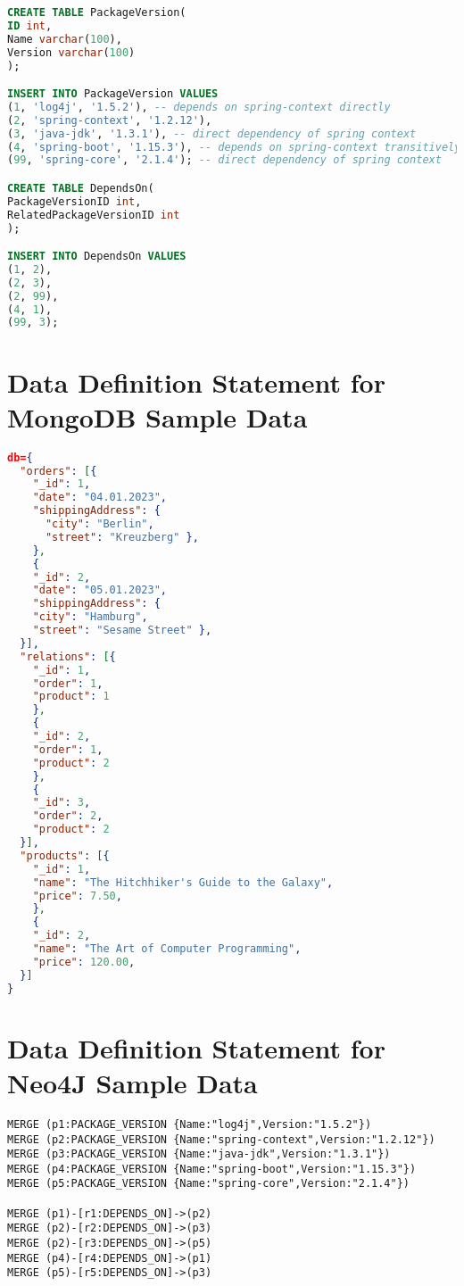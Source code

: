 \begin{lstlisting}[language=SQL, caption=DDL Statements, captionpos=b, label=lst:DDLStatements]
CREATE TABLE PackageVersion(
ID int,
Name varchar(100),
Version varchar(100)
);

INSERT INTO PackageVersion VALUES 
(1, 'log4j', '1.5.2'), -- depends on spring-context directly
(2, 'spring-context', '1.2.12'),
(3, 'java-jdk', '1.3.1'), -- direct dependency of spring context
(4, 'spring-boot', '1.15.3'), -- depends on spring-context transitively (spring-boot -> log4j -> spring-context)
(99, 'spring-core', '2.1.4'); -- direct dependency of spring context

CREATE TABLE DependsOn(
PackageVersionID int,
RelatedPackageVersionID int
);

INSERT INTO DependsOn VALUES 
(1, 2), 
(2, 3), 
(2, 99),
(4, 1),
(99, 3);
\end{lstlisting}

\section{Data Definition Statement for MongoDB Sample Data} \label{apx:Data Definition Statement for MongoDB Sample Data}
\begin{lstlisting}[language=JSON, caption=JSON, captionpos=b, label=lst:MongoDBStatements]
db={
  "orders": [{
    "_id": 1,
    "date": "04.01.2023",
    "shippingAddress": {
      "city": "Berlin",
      "street": "Kreuzberg" },
    },
    {
    "_id": 2,
    "date": "05.01.2023",
    "shippingAddress": {
    "city": "Hamburg",
    "street": "Sesame Street" },
  }],
  "relations": [{
    "_id": 1,
    "order": 1,
    "product": 1
    },
	{
    "_id": 2,
    "order": 1,
    "product": 2
    },
    {
    "_id": 3,
    "order": 2,
    "product": 2
  }],
  "products": [{
    "_id": 1,
    "name": "The Hitchhiker's Guide to the Galaxy",
    "price": 7.50,
    },
    {
    "_id": 2,
    "name": "The Art of Computer Programming",
    "price": 120.00,	
  }]
}
\end{lstlisting}

\section{Data Definition Statement for Neo4J Sample Data} \label{apx:Data Definition Statement for Neo4J Sample Data}
\begin{lstlisting}[caption=Cypher Statements, captionpos=b, label=lst:CypherStatements]
MERGE (p1:PACKAGE_VERSION {Name:"log4j",Version:"1.5.2"})
MERGE (p2:PACKAGE_VERSION {Name:"spring-context",Version:"1.2.12"})
MERGE (p3:PACKAGE_VERSION {Name:"java-jdk",Version:"1.3.1"})
MERGE (p4:PACKAGE_VERSION {Name:"spring-boot",Version:"1.15.3"})
MERGE (p5:PACKAGE_VERSION {Name:"spring-core",Version:"2.1.4"})

MERGE (p1)-[r1:DEPENDS_ON]->(p2)
MERGE (p2)-[r2:DEPENDS_ON]->(p3)
MERGE (p2)-[r3:DEPENDS_ON]->(p5)
MERGE (p4)-[r4:DEPENDS_ON]->(p1)
MERGE (p5)-[r5:DEPENDS_ON]->(p3)
\end{lstlisting}

